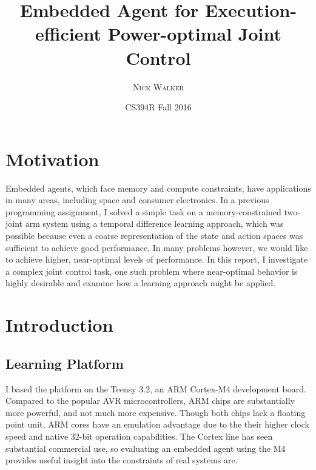 \documentclass{article}
\title{Embedded Agent for Execution-efficient Power-optimal Joint Control}
\author{\textsc{Nick Walker}}
\date{CS394R Fall 2016} %
\begin{document}
	
\maketitle %


\section{Motivation}

Embedded agents, which face memory and compute constraints, have applications in many areas, including space and consumer electronics. In a previous programming assignment, I solved a simple task on a memory-constrained two-joint arm system using a temporal difference learning approach, which was possible because even a coarse representation of the state and action spaces was sufficient to achieve good performance. In many problems however, we would like to achieve higher, near-optimal levels of performance. In this report, I investigate a complex joint control task, one such problem where near-optimal behavior is highly desirable and examine how a learning approach might be applied.



\section{Introduction}

\subsection{Learning Platform}

I based the platform on the Teensy 3.2, an ARM Cortex-M4 development board. Compared to the popular AVR microcontrollers, ARM chips are substantially more powerful, and not much more expensive. Though both chips lack a floating point unit, ARM cores have an emulation advantage due to the their higher clock speed and native 32-bit operation capabilities. The Cortex line has seen substantial commercial use, so evaluating an embedded agent using the M4 provides useful insight into the constraints of real systems are.
\end{document}
